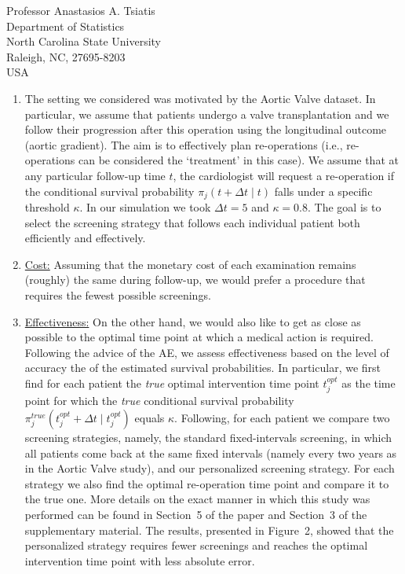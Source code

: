 \documentclass[a4paper, 11pt]{letter}
\begin{document}
\begin{letter}{Professor Anastasios A. Tsiatis\\
Department of Statistics\\
North Carolina State University\\
Raleigh, NC, 27695-8203\\
USA}
\begin{enumerate}
\begin{enumerate}
    \item The setting we considered was motivated by the Aortic Valve dataset. In particular, we assume that patients undergo a valve transplantation and we follow their progression after this operation using the longitudinal outcome (aortic gradient). The aim is to effectively plan re-operations (i.e., re-operations can be considered the `treatment' in this case). We assume that at any particular follow-up time $t$, the cardiologist will request a re-operation if the conditional survival probability $\pi_j(t + \Delta t \mid t)$ falls under a specific threshold $\kappa$. In our simulation we took $\Delta t = 5$ and $\kappa = 0.8$. The goal is to select the screening strategy that follows each individual patient both efficiently and effectively.

    \item \underline{Cost:} Assuming that the monetary cost of each examination remains (roughly) the same during follow-up, we would prefer a procedure that requires the fewest possible screenings.

    \item \underline{Effectiveness:} On the other hand, we would also like to get as close as possible to the optimal time point at which a medical action is required. Following the advice of the AE, we assess effectiveness based on the level of accuracy the of the estimated survival probabilities. In particular, we first find for each patient the \emph{true} optimal intervention time point $t_j^{opt}$ as the time point for which the \emph{true} conditional survival probability $\pi_j^{true}(t_j^{opt} + \Delta t \mid t_j^{opt})$ equals $\kappa$. Following, for each patient we compare two screening strategies, namely, the standard fixed-intervals screening, in which all patients come back at the same fixed intervals (namely every two years as in the Aortic Valve study), and our personalized screening strategy. For each strategy we also find the optimal re-operation time point and compare it to the true one. More details on the exact manner in which this study was performed can be found in Section~5 of the paper and Section~3 of the supplementary material. The results, presented in Figure~2, showed that the personalized strategy requires fewer screenings and reaches the optimal intervention time point with less absolute error.
    \end{enumerate}


\end{enumerate}
\end{letter}
\end{document}
